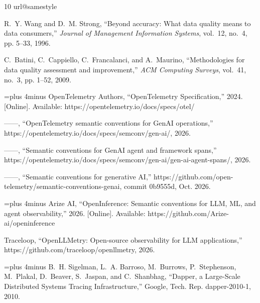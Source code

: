 \documentclass[conference]{IEEEtran}
\begin{document}
\balance
\begin{thebibliography}{10}
\providecommand{\url}[1]{#1}
\csname url@samestyle\endcsname
\providecommand{\newblock}{\relax}
\providecommand{\bibinfo}[2]{#2}
\providecommand{\BIBentrySTDinterwordspacing}{\spaceskip=0pt\relax}
\providecommand{\BIBentryALTinterwordstretchfactor}{4}
\providecommand{\BIBentryALTinterwordspacing}{\spaceskip=\fontdimen2\font plus
\BIBentryALTinterwordstretchfactor\fontdimen3\font minus
  \fontdimen4\font\relax}
\providecommand{\BIBdecl}{\relax}
\BIBdecl

R.~Y. Wang and D.~M. Strong, ``Beyond accuracy: What data quality means to data
  consumers,'' \emph{Journal of Management Information Systems}, vol.~12,
  no.~4, pp. 5--33, 1996.

C.~Batini, C.~Cappiello, C.~Francalanci, and A.~Maurino, ``Methodologies for
  data quality assessment and improvement,'' \emph{ACM Computing Surveys},
  vol.~41, no.~3, pp. 1--52, 2009.

\BIBentryALTinterwordspacing
{OpenTelemetry Authors}, ``{OpenTelemetry Specification},'' 2024. [Online].
  Available: \url{https://opentelemetry.io/docs/specs/otel/}
\BIBentrySTDinterwordspacing

------, ``{OpenTelemetry} semantic conventions for {GenAI} operations,''
  \url{https://opentelemetry.io/docs/specs/semconv/gen-ai/}, 2026.

------, ``Semantic conventions for {GenAI} agent and framework spans,''
  \url{https://opentelemetry.io/docs/specs/semconv/gen-ai/gen-ai-agent-spans/},
  2026.

------, ``Semantic conventions for generative {AI},''
  \url{https://github.com/open-telemetry/semantic-conventions-genai}, commit
  0b9555d, Oct. 2026.

\BIBentryALTinterwordspacing
{Arize AI}, ``{OpenInference}: Semantic conventions for {LLM}, {ML}, and agent
  observability,'' 2026. [Online]. Available:
  \url{https://github.com/Arize-ai/openinference}
\BIBentrySTDinterwordspacing

{Traceloop}, ``{OpenLLMetry}: Open-source observability for {LLM}
  applications,'' \url{https://github.com/traceloop/openllmetry}, 2026.

\BIBentryALTinterwordspacing
B.~H. Sigelman, L.~A. Barroso, M.~Burrows, P.~Stephenson, M.~Plakal, D.~Beaver,
  S.~Jaspan, and C.~Shanbhag, ``{Dapper, a Large-Scale Distributed Systems
  Tracing Infrastructure},'' Google, Tech. Rep. dapper-2010-1, 2010.
\BIBentrySTDinterwordspacing


\end{thebibliography}
\end{document}
